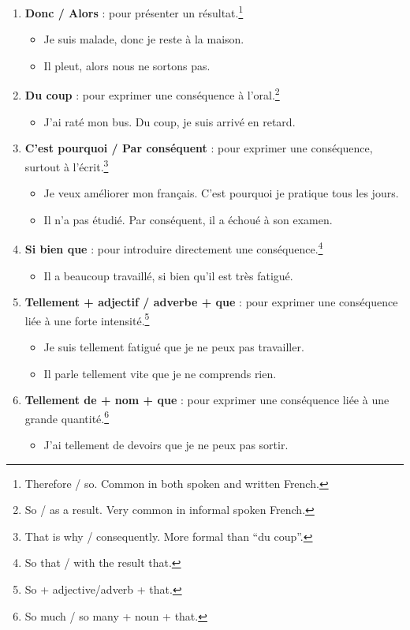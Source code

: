 \documentclass[math,code]{amznotes}
\theoremstyle{remark}
\begin{document}
\begin{enumerate}
    \item \textbf{Donc / Alors} : pour présenter un résultat.\footnote{Therefore / so. Common in both spoken and written French.}
    \begin{itemize}
        \item Je suis malade, donc je reste à la maison.
        \item Il pleut, alors nous ne sortons pas.
    \end{itemize}

    \item \textbf{Du coup} : pour exprimer une conséquence à l'oral.\footnote{So / as a result. Very common in informal spoken French.}
    \begin{itemize}
        \item J'ai raté mon bus. Du coup, je suis arrivé en retard.
    \end{itemize}

    \item \textbf{C'est pourquoi / Par conséquent} : pour exprimer une conséquence, surtout à l'écrit.\footnote{That is why / consequently. More formal than ``du coup''.}
    \begin{itemize}
        \item Je veux améliorer mon français. C'est pourquoi je pratique tous les jours.
        \item Il n'a pas étudié. Par conséquent, il a échoué à son examen.
    \end{itemize}

    \item \textbf{Si bien que} : pour introduire directement une conséquence.\footnote{So that / with the result that.}
    \begin{itemize}
        \item Il a beaucoup travaillé, si bien qu'il est très fatigué.
    \end{itemize}

    \item \textbf{Tellement + adjectif / adverbe + que} : pour exprimer une conséquence liée à une forte intensité.\footnote{So + adjective/adverb + that.}
    \begin{itemize}
        \item Je suis tellement fatigué que je ne peux pas travailler.
        \item Il parle tellement vite que je ne comprends rien.
    \end{itemize}

    \item \textbf{Tellement de + nom + que} : pour exprimer une conséquence liée à une grande quantité.\footnote{So much / so many + noun + that.}
    \begin{itemize}
        \item J'ai tellement de devoirs que je ne peux pas sortir.
    \end{itemize}
\end{enumerate}
\end{document}
